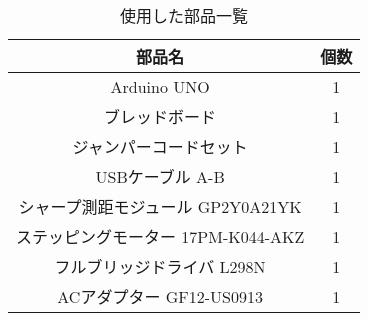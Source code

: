 \documentclass{jsarticle}
\begin{document}
\begin{table}[htbp]
 \caption{使用した部品一覧}
 \begin{center}
 \begin{tabular}{|c|c|}\hline
  部品名 & 個数\\\hline\hline
  Arduino UNO & 1\\\hline
  ブレッドボード & 1\\\hline
  ジャンパーコードセット & 1\\\hline
  USBケーブル A-B & 1\\\hline
  シャープ測距モジュール GP2Y0A21YK & 1\\\hline
  ステッピングモーター 17PM-K044-AKZ & 1\\\hline
  フルブリッジドライバ L298N & 1\\\hline
  ACアダプター GF12-US0913 & 1\\\hline
 \end{tabular}
 \end{center}
\end{table}
\end{document}
